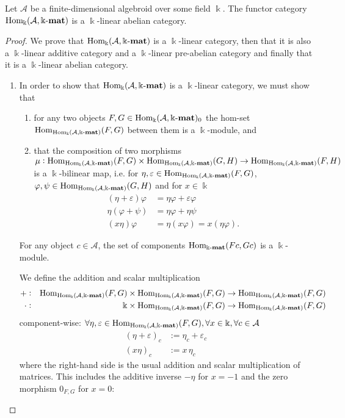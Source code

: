 \begin{theorem}\label{thm:functor_category_abelian}
Let $\mathcal{A}$ be a finite-dimensional algebroid over some field $\Bbbk$. The functor category $\mathrm{Hom_{\Bbbk}}(\mathcal{A},\Bbbk\textnormal{-}\mathbf{mat})$
is a $\Bbbk$-linear abelian category.
\end{theorem}
\begin{proof}
We prove that $\mathrm{Hom_{\Bbbk}}(\mathcal{A},\Bbbk\textnormal{-}\mathbf{mat})$ is a $\Bbbk$-linear category, then that it is also a $\Bbbk$-linear additive category and a $\Bbbk$-linear pre-abelian
category and finally that it is a $\Bbbk$-linear abelian category.
\begin{enumerate}
\renewcommand{\labelenumi}{(\theenumi)}
\item In order to show that $\mathrm{Hom_{\Bbbk}}(\mathcal{A},\Bbbk\textnormal{-}\mathbf{mat})$ is a $\Bbbk$-linear category, we must show that 
\begin{enumerate}
\renewcommand{\labelenumii}{(\roman{enumii})}
\item for any two objects $F,G \in \mathrm{Hom_{\Bbbk}}(\mathcal{A},\Bbbk\textnormal{-}\mathbf{mat})_{0}$ the hom-set $\mathrm{Hom}_{\mathrm{Hom_{\Bbbk}}(\mathcal{A},\Bbbk\textnormal{-}\mathbf{mat})}(F,G)$ between them is a $\Bbbk$-module, and
\item that the composition of two morphisms\\
$\mu : \mathrm{Hom}_{\mathrm{Hom_{\Bbbk}}(\mathcal{A},\Bbbk\textnormal{-}\mathbf{mat})}(F,G) \times \mathrm{Hom}_{\mathrm{Hom_{\Bbbk}}(\mathcal{A},\Bbbk\textnormal{-}\mathbf{mat})}(G,H) \rightarrow \mathrm{Hom}_{\mathrm{Hom_{\Bbbk}}(\mathcal{A},\Bbbk\textnormal{-}\mathbf{mat})}(F,H)$ is a
$\Bbbk$-bilinear map, i.e. for $\eta, \varepsilon \in \mathrm{Hom}_{\mathrm{Hom_{\Bbbk}}(\mathcal{A},\Bbbk\textnormal{-}\mathbf{mat})}(F,G)$,
$\varphi, \psi \in \mathrm{Hom}_{\mathrm{Hom_{\Bbbk}}(\mathcal{A},\Bbbk\textnormal{-}\mathbf{mat})}(G,H)$ and for $x \in \Bbbk$
\begin{align}
(\eta + \varepsilon)\varphi &= \eta\varphi + \varepsilon\varphi \\
\eta(\varphi + \psi) &= \eta\varphi + \eta\psi \\
(x\eta)\varphi &= \eta(x\varphi) = x(\eta\varphi).
\end{align}
\end{enumerate}

\begin{subproof}[Proof of (i)]
For any object $c \in \mathcal{A}$, the set of components $\mathrm{Hom}_{\Bbbk\textnormal{-}\mathbf{mat}}(Fc,Gc)$ is a $\Bbbk$-module.

We define the addition and scalar multiplication
\begin{align*}
+ :&& \mathrm{Hom}_{\mathrm{Hom_{\Bbbk}}(\mathcal{A},\Bbbk\textnormal{-}\mathbf{mat})}(F,G) &\times \mathrm{Hom}_{\mathrm{Hom_{\Bbbk}}(\mathcal{A},\Bbbk\textnormal{-}\mathbf{mat})}(F,G) \rightarrow \mathrm{Hom}_{\mathrm{Hom_{\Bbbk}}(\mathcal{A},\Bbbk\textnormal{-}\mathbf{mat})}(F,G)\\
\cdot :&& \Bbbk &\times \mathrm{Hom}_{\mathrm{Hom_{\Bbbk}}(\mathcal{A},\Bbbk\textnormal{-}\mathbf{mat})}(F,G) \rightarrow \mathrm{Hom}_{\mathrm{Hom_{\Bbbk}}(\mathcal{A},\Bbbk\textnormal{-}\mathbf{mat})}(F,G)
\end{align*}
component-wise: $\forall \eta, \varepsilon \in \mathrm{Hom}_{\mathrm{Hom_{\Bbbk}}(\mathcal{A},\Bbbk\textnormal{-}\mathbf{mat})}(F,G), \forall x \in \Bbbk, \forall c \in \mathcal{A}$
\begin{align}
(\eta+\varepsilon)_{c} &:= \eta_{c} + \varepsilon_{c}\\
(x \eta)_{c} &:= x\,\eta_{c}
\end{align}
where the right-hand side is the usual addition and scalar multiplication of matrices. This includes the additive inverse $-\eta$ for
$x = -1$ and the zero morphism $0_{F,G}$ for $x = 0$:


\end{subproof}
\end{enumerate}
\end{proof}
